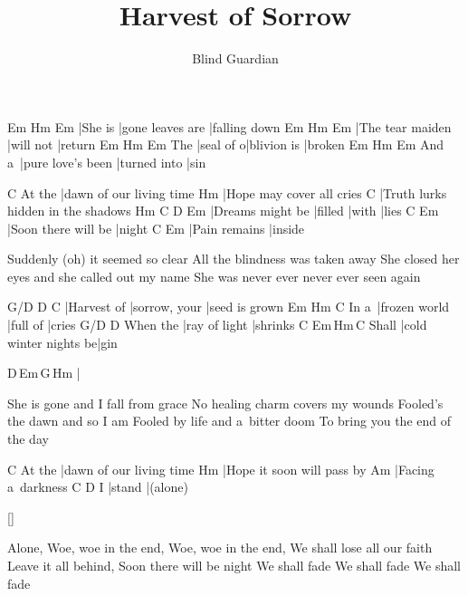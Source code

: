 \documentclass{song}
\title{Harvest of Sorrow}
\author{Blind Guardian}
\begin{document}
\strophe
Em\7    Hm               Em\7     
|She is |gone leaves are |falling down
Em\7             Hm        Em\7
|The tear maiden |will not |return
    Em\7      Hm          Em\7
The |seal of o|blivion is |broken
      Em\7              Hm           Em\7
And a~|pure love's been |turned into |sin
\endstrophe

\strophe
       C
At the |dawn of our living time
Hm
|Hope may cover all cries
C
|Truth lurks hidden in the shadows
Hm               C       D     Em
|Dreams might be |filled |with |lies
C                   Em
|Soon there will be |night
C             Em
|Pain remains |inside
\endstrophe

\strophe*
Suddenly (oh) it seemed so clear
All the blindness was taken away
She closed her eyes and she called out my name
She was never ever never ever seen again
\endstrophe

G/D         D             C
|Harvest of |sorrow, your |seed is grown
     Em            Hm       C
In a~|frozen world |full of |cries
         G/D           D
When the |ray of light |shrinks
      C                     Em\,Hm\,C
Shall |cold winter nights be|gin
\endstrophe

\strophe
D\,Em\,G\,Hm
|
\endstrophe

\strophe*
She is gone and I fall from grace
No healing charm covers my wounds
Fooled's the dawn and so I am
Fooled by life and a~bitter doom
To bring you the end of the day
\endstrophe

\strophe
       C
At the |dawn of our living time
Hm
|Hope it soon will pass by
Am
|Facing a~darkness
  C      D
I |stand |(alone)
\endstrophe

\ref{}

\strophe*
Alone,
Woe, woe in the end,
Woe, woe in the end,
We shall lose all our faith
Leave it all behind,
Soon there will be night
We shall fade
We shall fade
We shall fade
\endstrophe
\end{document}
